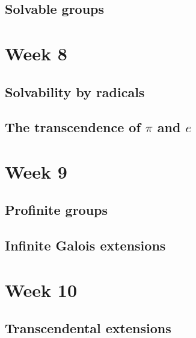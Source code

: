 \documentclass[12pt]{report}
\theoremstyle{definition}
\begin{document}
\section{Solvable groups}

\chapter*{Week 8}
\setcounter{chapter}{8}

\section{Solvability by radicals}

\section{The transcendence of $\pi$ and $e$}

\chapter*{Week 9}
\setcounter{chapter}{9}

\section{Profinite groups}

\section{Infinite Galois extensions}


\chapter*{Week 10}
\setcounter{chapter}{10}

\section{Transcendental extensions}




\end{document}
